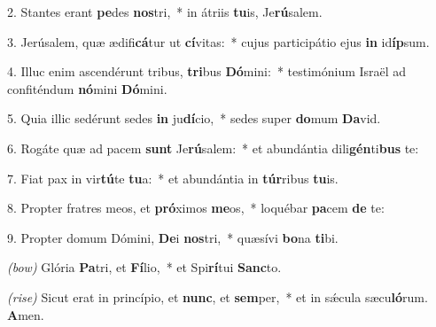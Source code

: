 2. Stantes erant \textbf{pe}des \textbf{nos}tri,~* in átriis \textbf{tu}is, Je\textbf{rú}salem.

3. Jerúsalem, quæ ædifi\textbf{cá}tur ut \textbf{cí}vitas:~* cujus participátio ejus \textbf{in} id\textbf{íp}sum.

4. Illuc enim ascendérunt tribus, \textbf{tri}bus \textbf{Dó}mini:~* testimónium Israël ad confiténdum \textbf{nó}mini \textbf{Dó}mini.

5. Quia illic sedérunt sedes \textbf{in} ju\textbf{dí}cio,~* sedes super \textbf{do}mum \textbf{Da}vid.

6. Rogáte quæ ad pacem \textbf{sunt} Je\textbf{rú}salem:~* et abundántia dili\textbf{gén}ti\textbf{bus} te:

7. Fiat pax in vir\textbf{tú}te \textbf{tu}a:~* et abundántia in \textbf{túr}ribus \textbf{tu}is.

8. Propter fratres meos, et \textbf{pró}ximos \textbf{me}os,~* loquébar \textbf{pa}cem \textbf{de} te:

9. Propter domum Dómini, \textbf{De}i \textbf{nos}tri,~* quæsívi \textbf{bo}na \textbf{ti}bi.

\textit{(bow)} Glória \textbf{Pa}tri, et \textbf{Fí}lio,~* et Spi\textbf{rí}tui \textbf{Sanc}to.

\textit{(rise)}  Sicut erat in princípio, et \textbf{nunc}, et \textbf{sem}per,~* et in s\'{\ae}cula sæcu\textbf{ló}rum. \textbf{A}men.